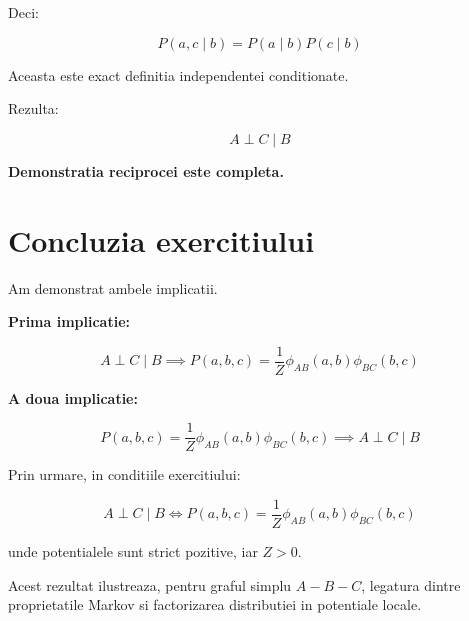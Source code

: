 \documentclass[12pt,a4paper]{article}
\begin{document}
Deci:

\[
\boxed{
P(a,c\mid b)=P(a\mid b)P(c\mid b)
}
\]

Aceasta este exact definitia independentei conditionate.

Rezulta:

\[
\boxed{A\perp C\mid B}
\]

\textbf{Demonstratia reciprocei este completa.}

\section{Concluzia exercitiului}

Am demonstrat ambele implicatii.

\textbf{Prima implicatie:}

\[
A\perp C\mid B
\implies
P(a,b,c)=
\frac{1}{Z}\phi_{AB}(a,b)\phi_{BC}(b,c)
\]

\textbf{A doua implicatie:}

\[
P(a,b,c)=
\frac{1}{Z}\phi_{AB}(a,b)\phi_{BC}(b,c)
\implies
A\perp C\mid B
\]

Prin urmare, in conditiile exercitiului:

\[
\boxed{
A\perp C\mid B
\iff
P(a,b,c)=
\frac{1}{Z}\phi_{AB}(a,b)\phi_{BC}(b,c)
}
\]

unde potentialele sunt strict pozitive, iar $Z>0$.

Acest rezultat ilustreaza, pentru graful simplu $A-B-C$, legatura dintre proprietatile Markov si factorizarea distributiei in potentiale locale.
\end{document}
